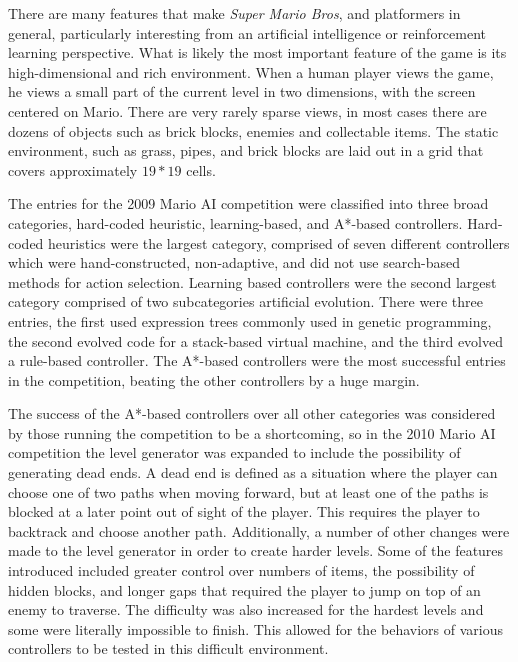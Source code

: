 \documentclass[12pt]{article}
\begin{document}
\begin{multicols}{2}
There are many features that make \textit {Super Mario Bros}, and platformers in general, particularly interesting from 
an artificial intelligence or reinforcement learning perspective. What is likely the most important feature of the game 
is its high-dimensional and rich environment. When a human player views the game, he views a small part of the 
current level in two dimensions, with the screen centered on Mario. There are very rarely sparse views, in most cases 
there are dozens of objects such as brick blocks, enemies and collectable items. The static environment, such as grass, 
pipes, and brick blocks are laid out in a grid that covers approximately $19 * 19$ cells.

The entries for the 2009 Mario AI competition were classified into three broad categories, hard-coded heuristic, 
learning-based, and A*-based controllers. Hard-coded heuristics were the largest category, comprised of seven 
different controllers which were hand-constructed, non-adaptive, and did not use search-based methods for action 
selection. Learning based controllers were the second largest category comprised of two subcategories artificial 
evolution. There were three entries, the first used expression trees commonly used in genetic programming, the 
second evolved code for a stack-based virtual machine, and the third evolved a rule-based controller. The A*-based 
controllers were the most successful entries in the competition, beating the other controllers by a huge margin.

The success of the A*-based controllers over all other categories was considered by those running the competition 
to be a shortcoming, so in the 2010 Mario AI competition the level generator was expanded to include the possibility 
of generating dead ends. A dead end is defined as a situation where the player can choose one of two paths when 
moving forward, but at least one of the paths is blocked  
at a later point out of sight of the player. This requires the player to backtrack and choose another 
path. Additionally, a number of other changes were made to the level generator in order to create harder levels. 
Some of the features introduced included greater control over numbers of items, the possibility of hidden blocks, and 
longer gaps that required the player to jump on top of an enemy to traverse. 
The difficulty was also increased for the hardest levels and some were literally impossible to finish. This 
allowed for the behaviors of various controllers to be tested in this difficult environment.


\end{multicols}
\end{document}
